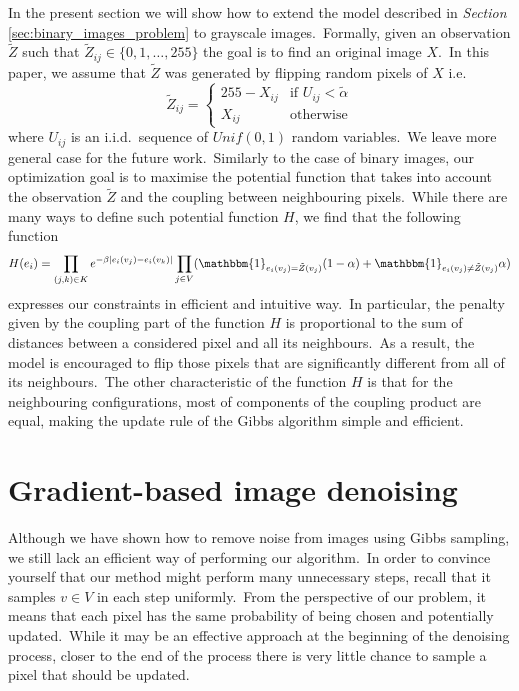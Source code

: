 \documentclass[shortabstract, english, lic]{iithesis}
\newcommand\numberedchapter[1]{\setlength\topskip{3cm}\chapter{#1}\setlength\topskip{0cm}}
\theoremstyle{default_theorem_style}\newtheorem{theorem}{Theorem}
\theoremstyle{default_theorem_style}\newtheorem{definition}{Definition}
\begin{document}
In the present section we will show how to extend the model described in \textit{Section}
\ref{sec:binary_images_problem} to grayscale images.\ Formally, given an observation $\tilde{Z}$ such
that $\tilde{Z}_{ij} \in \{0, 1, \dots, 255\}$ the goal is to find an original image $X$.\ In this paper, we assume
that $\tilde{Z}$ was generated by flipping random pixels of $X$ i.e.
$$
\tilde{Z}_{ij} =
\begin{cases}
  255 - X_{ij} &\text{if $U_{ij} < \tilde{\alpha}$}\\
  X_{ij} &\text{otherwise}
\end{cases}
$$
where $U_{ij}$ is an i.i.d.\ sequence of $Unif(0, 1)$ random variables.\ We leave more general case for the future
work.\ Similarly to the case of binary images, our optimization goal is to maximise the potential function that
takes into account the observation $\tilde{Z}$ and the coupling between neighbouring pixels.\ While there are many
ways to define such potential function $H$, we find that the following function
$$
H(e_i) = \prod\limits_{(j, k) \in K} e^{-\beta |e_i(v_j) - e_i(v_k)|}
\prod\limits_{j \in V}(\mathbbm{1}_{e_i(v_j) = \tilde{Z}(v_j)}(1 - \alpha) +
\mathbbm{1}_{e_i(v_j) \neq \tilde{Z}(v_j)}\alpha)
$$
expresses our constraints in efficient and intuitive way.\ In particular, the penalty given by the coupling part of
the function $H$ is proportional to the sum of distances between a considered pixel and all its neighbours.\ As a
result, the model is encouraged to flip those pixels that are significantly different from all of its
neighbours.\ The other characteristic of the function $H$ is that for the neighbouring configurations, most of
components of the coupling product are equal, making the update rule of the Gibbs algorithm simple and efficient.

\numberedchapter{Gradient-based image denoising}

Although we have shown how to remove noise from images using Gibbs sampling, we still lack an efficient way of
performing our algorithm.\ In order to convince yourself that our method
might perform many unnecessary steps, recall that it samples $v \in V$ in each step uniformly.\ From the perspective
of our problem, it means that each pixel has the same probability of being chosen and potentially updated.\ While
it may be an effective approach at the beginning of the denoising process, closer to the end of the process there is
very little chance to sample a pixel that should be updated.\newline
\end{document}
